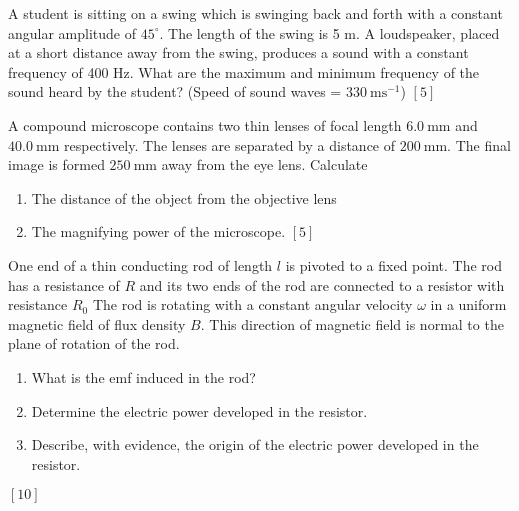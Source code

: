 \begin{problem}
    \begin{subproblem}
        A student is sitting on a swing which is swinging back and forth with a constant angular amplitude of $45^{\circ}$. The length of the swing is 5 m. A loudspeaker, placed at a short distance away from the swing, produces a sound with a constant frequency of 400 Hz. What are the maximum and minimum frequency of the sound heard by the student? (Speed of sound waves = $\qty{330}{\m\s^{-1}}$) \hfill $[5]$
    \end{subproblem}
    \renewcommand{\theenumi}{(\alph{enumi})}
    \begin{subproblem}
        A compound microscope contains two thin lenses of focal length $\qty{6.0}{\mm}$ and $\qty{40.0}{\mm}$ respectively. The lenses are separated by a distance of $\qty{200}{\mm}$. The final image is formed $\qty{250}{\mm}$ away from the eye lens. Calculate
        \begin{enumerate}
            \item The distance of the object from the objective lens
            \item The magnifying power of the microscope. \hfill $[5]$
        \end{enumerate}
    \end{subproblem}
\end{problem}

\begin{problem}
    One end of a thin conducting rod of length $l$ is pivoted to a fixed point. The rod has a resistance of $R$ and its two ends of the rod are connected to a resistor with resistance $R_0$ The rod is rotating with a constant angular velocity $\omega$ in a uniform magnetic field of flux density $B$. This direction of magnetic field is normal to the plane of rotation of the rod.
    \renewcommand{\theenumi}{(\alph{enumi})}
    \begin{enumerate}
        \item What is the emf induced in the rod?
        \item Determine the electric power developed in the resistor.
        \item Describe, with evidence, the origin of the electric power developed in the resistor.
    \end{enumerate}
    \hfill $[10]$
\end{problem}

